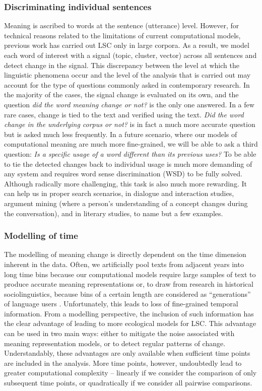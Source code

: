 \documentclass[output=paper]{langscibook}
\begin{document}
\subsubsection{Discriminating individual sentences}
\label{subsec:intent-indiv}
Meaning is ascribed to words at the sentence (utterance) level. However, for technical reasons related to the limitations of current computational models, previous work has carried out LSC only in large corpora. As a result, we model each word of interest with a signal (topic, cluster, vector) across all sentences and detect change in the signal. This discrepancy between the level at which the linguistic phenomena occur and the level of the analysis that is carried out may account for the type of questions commonly asked in contemporary research. In the majority of the cases, the signal change is evaluated on its own, and the question \textit{did the word meaning change or not?} is the only one answered. In a few rare cases, change is tied to the text and verified using the text. \textit{Did the word change in the underlying corpus or not?} is in fact a much more accurate question but is asked much less frequently. 
In a future scenario, where our models of computational meaning are much more fine-grained, we will be able to ask a third question: \textit{Is a specific usage of a word different than its previous uses?} To be able to tie the detected changes back to individual usage is much more demanding of any system and requires word sense discrimination (WSD) to be fully solved. Although radically more challenging, this task is also much more rewarding. It can help us in proper search scenarios, in dialogue and interaction studies, argument mining (where a person's understanding of a concept changes during the conversation), and in literary studies, to name but a few examples.


\subsubsection{Modelling of time}
The modelling of meaning change is directly dependent on the time dimension inherent in the data. Often, we artificially pool texts from adjacent years into long time bins because our computational models require large samples of text to produce accurate meaning representations or, to draw from research in historical sociolinguistics, because bins of a certain length are considered as ``generations'' of language users \citep{saily2016sociolinguistic}. Unfortunately, this leads to loss of fine-grained temporal information. 
From a modelling perspective, the inclusion of such information has the clear advantage of leading to more ecological models for LSC. This advantage can be used in two main ways: either to mitigate the noise associated with meaning representation models, or to detect regular patterns of change. Understandably, these advantages are only available when sufficient time points are included in the analysis. More time points, however, undoubtedly lead to greater computational complexity -- linearly if we consider the comparison of only subsequent time points, or quadratically if we consider all pairwise comparisons.
\end{document}
